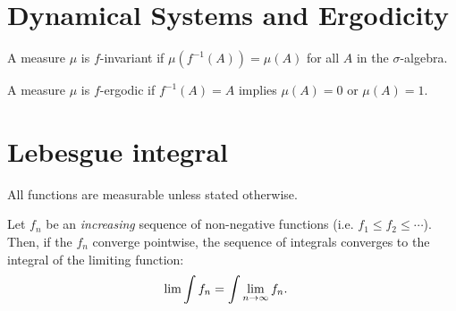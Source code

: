 \section{Dynamical Systems and Ergodicity}

\begin{definition}
  A measure $\mu$ is $f$-invariant if $\mu(f^{-1}(A)) = \mu(A)$ for all $A$ in the $\sigma$-algebra.
\end{definition}

\begin{definition}
  A measure $\mu$ is $f$-ergodic if $f^{-1}(A) = A$ implies $\mu(A) = 0$ or $\mu(A) = 1$.
\end{definition}


\section{Lebesgue integral}

All functions are measurable unless stated otherwise.

\begin{theorem*}[MCT]
  Let $f_n$ be an {\it increasing} sequence of non-negative functions (i.e. $f_1 \leq f_2 \leq \cdots$). Then, if
  the $f_n$ converge pointwise, the sequence of integrals converges to the integral of the limiting function:
  \begin{align*}
    \lim \int f_n &= \int \limn f_n.
  \end{align*}
\end{theorem*}


